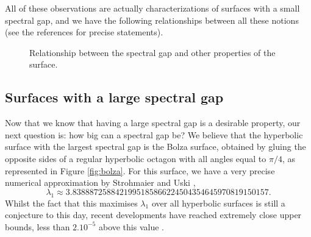 \documentclass[12pt,twoside]{article}
\theoremstyle{theorem}
\theoremstyle{remark}
\theoremstyle{definition}
\theoremstyle{example}
\DeclareMathOperator{\diam}{diam}
\newcommand{\1}[1]{\mathds{1}_{#1}}
\begin{document}
All of these observations are actually characterizations of surfaces with a small spectral gap, and
we have the following relationships between all these notions (see the references for precise statements).
\begin{figure}[h]
  \centering
  \caption{Relationship between the spectral gap and other properties of the surface.}
  \label{fig:eq_gap}
\end{figure}

\subsection{Surfaces with a large spectral gap}
\label{sec:surfaces-with-large-gap}

Now that we know that having a large spectral gap is a desirable property, our next question is: how
big can a spectral gap be? We believe that the hyperbolic surface with the largest spectral gap is
the Bolza surface, obtained by gluing the opposite sides of a regular hyperbolic octagon with all
angles equal to $\pi/4$, as represented in Figure \ref{fig:bolza}. For this surface, we have a very
precise numerical approximation by Strohmaier and Uski \cite{strohmaier2013},
\begin{equation*}
  \lambda_1
  \approx 3.8388872588421995185866224504354645970819150157.
\end{equation*}
Whilst the fact that this maximises $\lambda_1$ over all hyperbolic surfaces is still a conjecture
to this day, recent developments have reached extremely close upper bounds, less than $2.10^{-5}$
above this value \cite{kravchuk2024,bonifacio2022}.
\end{document}
